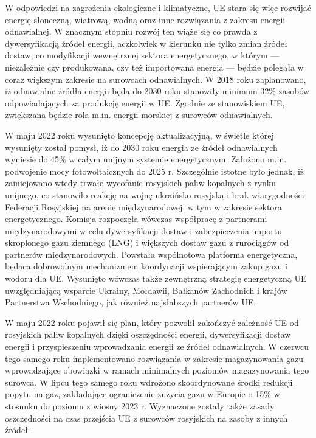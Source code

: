 \documentclass[polish, twoside, 12pt, a4paper]{article}
\theoremstyle{definition}
\theoremstyle{plain}
\theoremstyle{remark}
\begin{document}
W odpowiedzi na zagrożenia ekologiczne i klimatyczne, UE stara się więc rozwijać energię słoneczną, wiatrową, wodną oraz inne rozwiązania z zakresu energii odnawialnej. W znacznym stopniu rozwój ten wiąże się co prawda z dywersyfikacją źródeł energii, aczkolwiek w kierunku nie tylko zmian źródeł dostaw, co modyfikacji wewnętrznej sektora energetycznego, w którym --- niezależnie czy produkowana, czy też importowana energia --- będzie polegała w coraz większym zakresie na surowcach odnawialnych. W 2018 roku zaplanowano, iż odnawialne źródła energii będą do 2030 roku stanowiły minimum 32\% zasobów odpowiadających za produkcję energii w UE. Zgodnie ze stanowiskiem UE, zwiększana będzie rola m.in. energii morskiej z surowców odnawialnych. 

W maju 2022 roku wysunięto koncepcję aktualizacyjną, w świetle której wysunięty został pomysł, iż do 2030 roku energia ze źródeł odnawialnych wyniesie do 45\% w całym unijnym systemie energetycznym. Założono m.in. podwojenie mocy fotowoltaicznych do 2025 r. Szczególnie istotne było jednak, iż zainicjowano wtedy trwałe wycofanie rosyjskich paliw kopalnych z rynku unijnego, co stanowiło reakcję na wojnę ukraińsko-rosyjską i brak wiarygodności Federacji Rosyjskiej na arenie międzynarodowej, w tym w zakresie sektora energetycznego. Komisja rozpoczęła wówczas współpracę z partnerami międzynarodowymi w celu dywersyfikacji dostaw i zabezpieczenia importu skroplonego gazu ziemnego (LNG) i większych dostaw gazu z rurociągów od partnerów międzynarodowych. Powstała wspólnotowa platforma energetyczna, będąca dobrowolnym mechanizmem koordynacji wspierającym zakup gazu i wodoru dla UE. Wysunięto wówczas także zewnętrzną strategię energetyczną UE uwzględniającą wsparcie Ukrainy, Mołdawii, Bałkanów Zachodnich i krajów Partnerstwa Wschodniego, jak również najsłabszych partnerów UE.

W maju 2022 roku pojawił się plan, który pozwolił zakończyć zależność UE od rosyjskich paliw kopalnych dzięki oszczędności energii, dywersyfikacji dostaw energii i przyspieszeniu wprowadzania energii ze źródeł odnawialnych. W czerwcu tego samego roku implementowano rozwiązania w zakresie magazynowania gazu wprowadzające obowiązki w ramach minimalnych poziomów magazynowania tego surowca. W lipcu tego samego roku wdrożono skoordynowane środki redukcji popytu na gaz, zakładające ograniczenie zużycia gazu w Europie o 15\% w stosunku do poziomu z wiosny 2023 r. Wyznaczone zostały także zasady oszczędności na czas przejścia UE z surowców rosyjskich na zasoby z innych źródeł \citep{ep2023}. 
\end{document}
